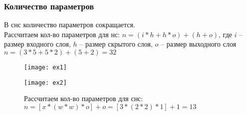\documentclass[unicode, notheorems]{beamer}
\begin{document}
\begin{frame}
	\frametitle{Количество параметров}
	В снс количество параметров сокращается.\\
	Рассчитаем кол-во параметров для нс:
		$n = (i * h + h * o) + (h + o)$, где $i$ -- размер входного слоя, $h$ -- размер скрытого слоя, $o$ -- размер выходного слоя $n = (3 * 5 + 5 * 2) + (5 + 2) = 32$
	\begin{figure}[h]
	\begin{center}
		\begin{minipage}[h]{0.4\linewidth}
			\texttt{[image: ex1]}
			\end{minipage}
			\begin{minipage}[h]{0.4\linewidth}
			\texttt{[image: ex2]}
		\end{minipage}
	\end{center}
	Рассчитаем кол-во параметров для снс:
	$n = [ x * ( w * w ) * o ] + o = [3 * (2 * 2) * 1] + 1 = 13$
\end{figure}





\end{frame}
\end{document}
